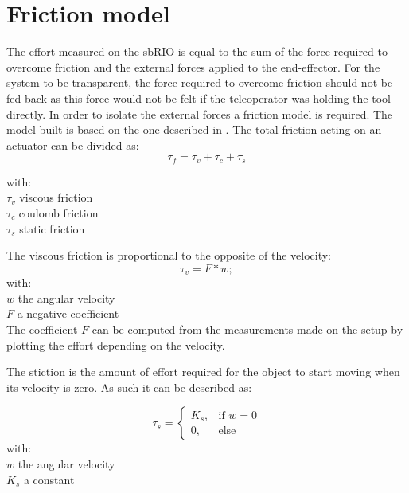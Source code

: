 \section{Friction model}

The effort measured on the sbRIO is equal to the sum of the force required to overcome friction and the external forces applied to the end-effector. For the system to be transparent, the force required to overcome friction should not be fed back as this force would not be felt if the teleoperator was holding the tool directly. In order to isolate the external forces a friction model is required. The model built is based on the one described in \cite{force_reflection}. The total friction acting on an actuator can be divided as:
\begin{equation}
\tau_f = \tau_v + \tau_c + \tau_s
\label{eq:total_friction}
\end{equation} 

with:\\
\hspace*{8mm} $\tau_v$ viscous friction\\
\hspace*{8mm} $\tau_c$ coulomb friction\\
\hspace*{8mm} $\tau_s$ static friction    


The viscous friction is proportional to the opposite of the velocity:
\begin{equation}
\tau_v = F * w;
\label{eq:viscous_friction}
\end{equation}
with:\\
\hspace*{8mm}$w$ the angular velocity\\
\hspace*{8mm}$F$ a negative coefficient\\

The coefficient $F$ can be computed from the measurements made on the setup by plotting the effort depending on the velocity.

The stiction is the amount of effort required for the object to start moving when its velocity is zero. As such it can be described as:

\begin{equation} 
\tau_s =  \begin{cases} K_s, & \mbox{if } w = 0 \\ 0, & \mbox{else} \end{cases}
\label{eq:static_friction}
\end{equation}
with:\\
\hspace*{8mm}$w$ the angular velocity\\
\hspace*{8mm}$K_s$ a constant\\

